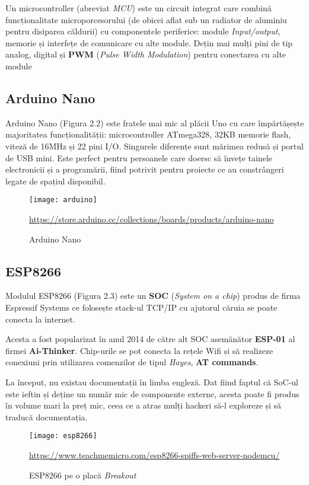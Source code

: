 Un microcontroller (abreviat \emph{MCU}) este un circuit integrat care combină funcționalitate microporcesorului (de obicei aflat sub un radiator de aluminiu pentru disiparea căldurii) cu componentele periferice: module \emph{Input/output}, memorie și interfețe de comunicare cu alte module. Dețin mai mulți pini de tip analog, digital și \textbf{PWM} (\emph{Pulse Width Modulation}) pentru conectarea cu alte module

\break

\subsection{Arduino Nano}

Arduino Nano (Figura 2.2) este fratele mai mic al plăcii Uno cu care împărtășește majoritatea funcționalității: microcontroller ATmega328, 32KB memorie flash, viteză de 16MHz și 22 pini I/O.  Singurele diferențe sunt mărimea redusă și portul de USB mini. Este perfect pentru persoanele care doersc să învețe tainele electronicii și a programării, fiind potrivit pentru proiecte ce au constrângeri legate de spațiul disponibil.

\begin{figure}[h]
	\centering
	\texttt{[image: arduino]}
	\caption{Arduino Nano}\url{https://store.arduino.cc/collections/boards/products/arduino-nano}
	\label{fig:arduino}
\end{figure}

\subsection{ESP8266}

Modulul ESP8266 (Figura 2.3) este un \textbf{SOC} (\emph{System on a chip}) produs de firma Espressif Systems ce folosește stack-ul TCP/IP cu ajutorul căruia se poate conecta la internet.

Acesta a fost popularizat în anul 2014 de către alt SOC asemănător \textbf{ESP-01} al firmei \textbf{Ai-Thinker}. Chip-urile se pot conecta la rețele Wifi și să realizeze conexiuni prin utilizarea comenzilor de tipul \emph{Hayes}, \textbf{AT commands}.

La început, nu existau documentații în limba engleză. Dat fiind faptul că SoC-ul este ieftin și deține un număr mic de componente externe, acesta poate fi produs în volume mari la preț mic, ceea ce a atras mulți hackeri să-l exploreze și să traducă documentația. 

\begin{figure}[h]
	\centering
	\texttt{[image: esp8266]}
	\caption{ESP8266 pe o placă \emph{Breakout}}\url{https://www.teachmemicro.com/esp8266-spiffs-web-server-nodemcu/}
	\label{fig:esp8266}
\end{figure}

